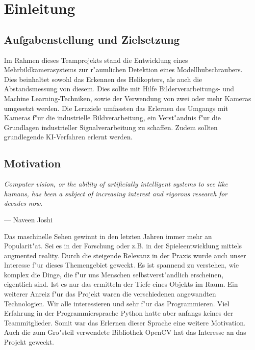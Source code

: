\chapter{Einleitung}
\label{cha:einleitung}

\section{Aufgabenstellung und Zielsetzung}
\label {sec:aufgabenstellungzielsetzung}

Im Rahmen dieses Teamprojekts stand die Entwicklung eines Mehrbildkamerasystems zur r"aumlichen Detektion eines Modellhubschraubers. Dies beinhaltet sowohl das Erkennen des Helikopters, als auch die Abstandsmessung von diesem.\newline
Dies sollte mit Hilfe Bilderverarbeitungs- und Machine Learning-Techniken, sowie der Verwendung von zwei oder mehr Kameras umgesetzt werden.\newline
Die Lernziele umfassten das Erlernen des Umgangs mit Kameras f"ur die industrielle Bildverarbeitung, ein Verst"andnis f"ur die Grundlagen industrieller Signalverarbeitung zu schaffen. Zudem sollten grundlegende KI-Verfahren erlernt werden.\newline

\section{Motivation}
\label {sec:motivation}

\setlength\epigraphwidth{15cm}
\setlength\epigraphrule{0pt}

\epigraph{\textit{\glqq Computer vision, or the ability of artificially intelligent systems to see like humans, has been a subject of increasing interest and rigorous research for decades now.\grqq{}}}{--- \textup{}Naveen Joshi\cite{NJ}\\}

Das maschinelle Sehen gewinnt in den letzten Jahren immer mehr an Popularit"at. Sei es in der Forschung oder z.B. in der Spieleentwicklung mittels augmented reality.\newline
Durch die steigende Relevanz in der Praxis wurde auch unser Interesse f"ur dieses Themengebiet geweckt. Es ist spannend zu verstehen, wie komplex die Dinge, die f"ur uns Menschen selbstverst"andlich erscheinen, eigentlich sind. Ist es nur das ermitteln der Tiefe eines Objekts im Raum.\newline
Ein weiterer Anreiz f"ur das Projekt waren die verschiedenen angewandten Technologien. Wir alle interessieren und sehr f"ur das Programmieren. Viel Erfahrung in der Programmiersprache Python hatte aber anfangs keines der Teammitglieder. Somit war das Erlernen dieser Sprache eine weitere Motivation.\newline
Auch die zum Gro"steil verwendete Bibliothek OpenCV hat das Interesse an das Projekt geweckt.


